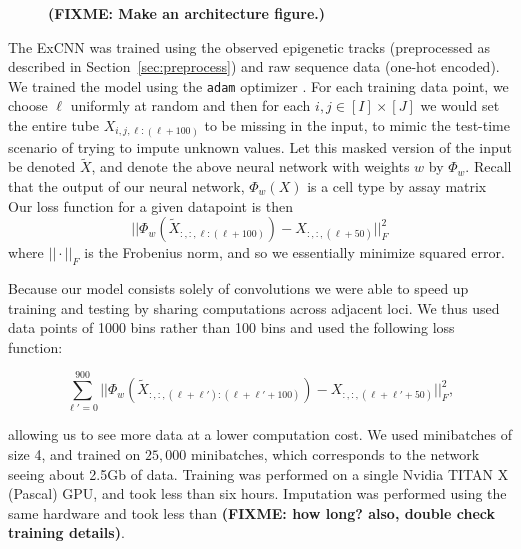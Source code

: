 \documentclass[11pt]{article}
\def\fixme#1{\textbf{(FIXME: #1)}}
\begin{document}
\begin{figure}
\caption{\fixme{Make an architecture figure.}}
\label{fig:arch}
\end{figure}

The ExCNN was trained using the observed epigenetic tracks (preprocessed as described in Section~\ref{sec:preprocess}) and raw sequence data (one-hot encoded). We trained the model using the \texttt{adam} optimizer \cite{kingma2015adam}. For each training data point, we choose $\ell$ uniformly at random and then for each $i, j \in [I] \times [J]$ we would set the entire tube $X_{i, j, \ell:(\ell+100)}$ to be missing in the input, to mimic the test-time scenario of trying to impute unknown values. Let this masked version of the input be denoted $\tilde{X}$, and denote the above neural network with weights $w$ by $\Phi_w$. Recall that the output of our neural network, $\Phi_w(X)$ is a cell type by assay matrix Our loss function for a given datapoint is then
\[
||\Phi_w(\tilde{X}_{:, :, \ell:(\ell+100)}) - X_{:, :,(\ell+50)}||^2_F
\]
where $||\cdot||_F$ is the Frobenius norm, and so we essentially minimize squared error.

Because our model consists solely of convolutions we were able to speed up training and testing by sharing computations across adjacent loci. We thus used data points of 1000 bins rather than 100 bins and used the following loss function:

\[
\sum_{\ell'=0}^{900} ||\Phi_w(\tilde{X}_{:, :, (\ell + \ell'):(\ell + \ell' + 100)}) - X_{:, :, (\ell + \ell' + 50)}||_F^2,
\]

allowing us to see more data at a lower computation cost. We used minibatches of size 4, and trained on $25,000$ minibatches, which corresponds to the network seeing about 2.5Gb of data. Training was performed on a single Nvidia TITAN X (Pascal) GPU, and took less than six hours.  Imputation was performed using the same hardware and took less than \fixme{how long? also, double check training details}.
\end{document}
